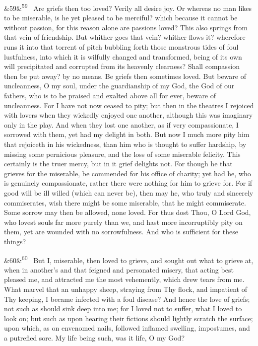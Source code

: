 \documentclass[12pt]{article}
\newcommand{\para}[1][]{\par\noindent\ifx&#1&\else\textsuperscript{\footnotesize #1}~\fi}
\begin{document}
\para[59] Are griefs then too loved? Verily all desire joy. Or whereas no man likes to be miserable, is he yet pleased to be merciful? which because it cannot be without passion, for this reason alone are passions loved? This also springs from that vein of friendship. But whither goes that vein? whither flows it? wherefore runs it into that torrent of pitch bubbling forth those monstrous tides of foul lustfulness, into which it is wilfully changed and transformed, being of its own will precipitated and corrupted from its heavenly clearness? Shall compassion then be put away? by no means. Be griefs then sometimes loved. But beware of uncleanness, O my soul, under the guardianship of my God, the God of our fathers, who is to be praised and exalted above all for ever, beware of uncleanness. For I have not now ceased to pity; but then in the theatres I rejoiced with lovers when they wickedly enjoyed one another, although this was imaginary only in the play. And when they lost one another, as if very compassionate, I sorrowed with them, yet had my delight in both. But now I much more pity him that rejoiceth in his wickedness, than him who is thought to suffer hardship, by missing some pernicious pleasure, and the loss of some miserable felicity. This certainly is the truer mercy, but in it grief delights not. For though he that grieves for the miserable, be commended for his office of charity; yet had he, who is genuinely compassionate, rather there were nothing for him to grieve for. For if good will be ill willed (which can never be), then may he, who truly and sincerely commiserates, wish there might be some miserable, that he might commiserate. Some sorrow may then be allowed, none loved. For thus dost Thou, O Lord God, who lovest souls far more purely than we, and hast more incorruptibly pity on them, yet are wounded with no sorrowfulness. And who is sufficient for these things?

\para[60] But I, miserable, then loved to grieve, and sought out what to grieve at, when in another's and that feigned and personated misery, that acting best pleased me, and attracted me the most vehemently, which drew tears from me. What marvel that an unhappy sheep, straying from Thy flock, and impatient of Thy keeping, I became infected with a foul disease? And hence the love of griefs; not such as should sink deep into me; for I loved not to suffer, what I loved to look on; but such as upon hearing their fictions should lightly scratch the surface; upon which, as on envenomed nails, followed inflamed swelling, impostumes, and a putrefied sore. My life being such, was it life, O my God?
\end{document}
